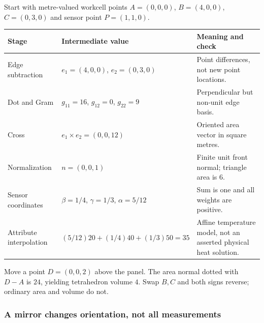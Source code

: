 Start with metre-valued workcell points \(A=(0,0,0)\), \(B=(4,0,0)\), \(C=(0,3,0)\) and sensor point \(P=(1,1,0)\).

{\def\LTcaptype{none} %
\begin{longtable}[]{@{}
  >{\raggedright\arraybackslash}p{}
  >{\raggedright\arraybackslash}p{}
  >{\raggedright\arraybackslash}p{}@{}}
\toprule\noalign{}
\begin{minipage}[b]{\linewidth}\raggedright
Stage
\end{minipage} & \begin{minipage}[b]{\linewidth}\raggedright
Intermediate value
\end{minipage} & \begin{minipage}[b]{\linewidth}\raggedright
Meaning and check
\end{minipage} \\
\midrule\noalign{}
\endhead
\bottomrule\noalign{}
\endlastfoot
Edge subtraction & \(e_1=(4,0,0)\), \(e_2=(0,3,0)\) & Point differences, not new point locations. \\
Dot and Gram & \(g_{11}=16\), \(g_{12}=0\), \(g_{22}=9\) & Perpendicular but non-unit edge basis. \\
Cross & \(e_1\times e_2=(0,0,12)\) & Oriented area vector in square metres. \\
Normalization & \(n=(0,0,1)\) & Finite unit front normal; triangle area is \(6\). \\
Sensor coordinates & \(\beta=1/4\), \(\gamma=1/3\), \(\alpha=5/12\) & Sum is one and all weights are positive. \\
Attribute interpolation & \((5/12)20+(1/4)40+(1/3)50=35\) & Affine temperature model, not an asserted physical heat solution. \\
\end{longtable}
}

Move a point \(D=(0,0,2)\) above the panel. The area normal dotted with \(D-A\) is \(24\), yielding tetrahedron volume \(4\). Swap \(B,C\) and both signs reverse; ordinary area and volume do not.

\subsubsection{A mirror changes orientation, not all measurements}\label{appendix-92ff77d4dfdc-a-mirror-changes-orientation-not-all-measurements}

